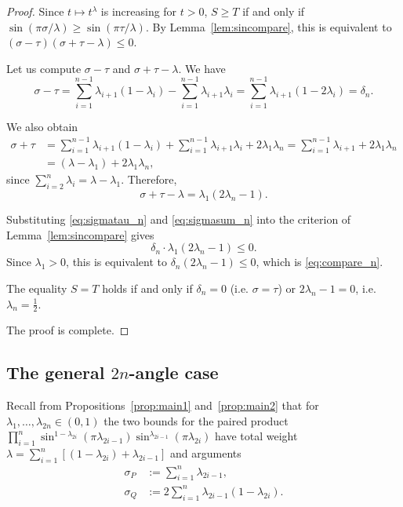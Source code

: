 \documentclass[12pt]{amsart}
\theoremstyle{definition}
\begin{document}
\begin{proof}
Since $t\mapsto t^\lambda$ is increasing for $t>0$, $S\geq T$ if and only if
$\sin(\pi\sigma/\lambda)\geq\sin(\pi\tau/\lambda)$.
By Lemma~\ref{lem:sincompare}, this is equivalent to
$(\sigma-\tau)(\sigma+\tau-\lambda)\leq 0$.

\medskip
Let us compute $\sigma-\tau$ and $\sigma+\tau-\lambda$. We have
\begin{equation}\label{eq:sigmatau_n}
  \sigma-\tau
  =\sum_{i=1}^{n-1}\lambda_{i+1}(1-\lambda_i)-\sum_{i=1}^{n-1}\lambda_{i+1}\lambda_i
  =\sum_{i=1}^{n-1}\lambda_{i+1}(1-2\lambda_i)
  =\delta_n.
\end{equation}

\medskip
We also obtain
\begin{align*}
  \sigma+\tau
  &=\sum_{i=1}^{n-1}\lambda_{i+1}(1-\lambda_i)+\sum_{i=1}^{n-1}\lambda_{i+1}\lambda_i
   +2\lambda_1\lambda_n
  =\sum_{i=1}^{n-1}\lambda_{i+1}+2\lambda_1\lambda_n\\
  &=(\lambda-\lambda_1)+2\lambda_1\lambda_n,
\end{align*}
since $\sum_{i=2}^n\lambda_i=\lambda-\lambda_1$.  Therefore,
\begin{equation}\label{eq:sigmasum_n}
  \sigma+\tau-\lambda = \lambda_1(2\lambda_n-1).
\end{equation}

\medskip
Substituting \eqref{eq:sigmatau_n} and \eqref{eq:sigmasum_n} into
the criterion of Lemma~\ref{lem:sincompare} gives
\[
  \delta_n\cdot\lambda_1(2\lambda_n-1)\leq 0.
\]
Since $\lambda_1>0$, this is equivalent to $\delta_n(2\lambda_n-1)\leq 0$,
which is \eqref{eq:compare_n}.

The equality $S=T$ holds if and only if $\delta_n=0$ (i.e. $\sigma=\tau$) or
$2\lambda_n-1=0$, i.e. $\lambda_n=\tfrac12$.  

The proof is complete.
\end{proof}


\subsection{The general \texorpdfstring{$2n$}{2n}-angle case}\label{sec:2nangle}

Recall from Propositions~\ref{prop:main1} and~\ref{prop:main2} that
for $\lambda_1,\ldots,\lambda_{2n}\in(0,1)$ the two bounds for the
paired product
$\displaystyle\prod_{i=1}^{n}\sin^{1-\lambda_{2i}}(\pi\lambda_{2i-1})
\sin^{\lambda_{2i-1}}(\pi\lambda_{2i})$
have total weight $\lambda=\displaystyle\sum_{i=1}^n[(1-\lambda_{2i})+\lambda_{2i-1}]$
and arguments
\begin{align*}
  \sigma_P &:= \sum_{i=1}^{n}\lambda_{2i-1},\\
  \sigma_Q &:= 2\sum_{i=1}^{n}\lambda_{2i-1}(1-\lambda_{2i}).
\end{align*}
\end{document}
